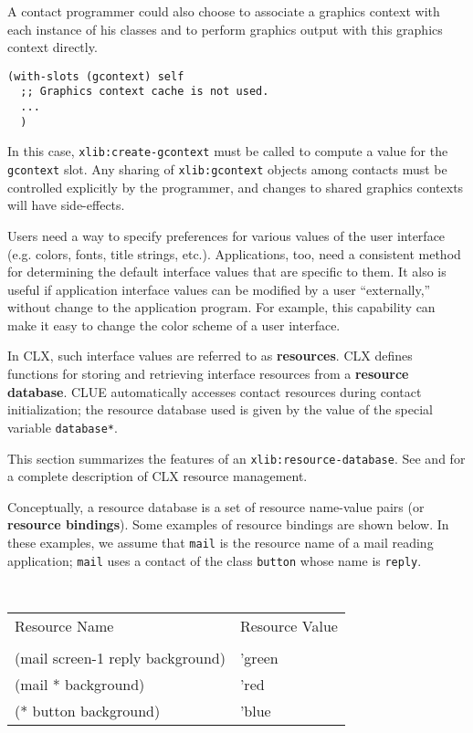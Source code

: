 \documentclass[twoside]{book}
\begin{document}
\begin{sloppy}
A contact programmer could also choose to associate a graphics context
with each instance of his classes and to perform graphics output with
this graphics context directly.

{\samepage
\begin{center}
\begin{verbatim}
(with-slots (gcontext) self
  ;; Graphics context cache is not used.
  ...
  )
\end{verbatim}

\end{center}}

In this case, {\tt xlib:create-gcontext} must be called to compute a value for the
{\tt gcontext} slot. Any sharing of {\tt xlib:gcontext} objects among
contacts must be controlled  explicitly by the programmer, and changes to shared
graphics contexts will have side-effects.


Users need a way to specify preferences for various values of the user interface
(e.g. colors, fonts, title strings, etc.). Applications, too, need a
consistent method
for determining the default interface values that are specific to them. It also
is useful if application interface values can be modified by a user
``externally,'' without change to the application program. For example, this
capability can make it easy to change the color scheme of a user
interface. 

In CLX, such interface values
are referred to as {\bf resources}. CLX defines functions for
storing and retrieving interface resources from  a {\bf resource
database}. CLUE automatically accesses contact
resources during contact initialization; the resource database used is given by
the value of the special variable {\tt *database*}.

This section summarizes the features of an {\tt xlib:resource-database}.
See \cite{xlib} and \cite{clx} for a complete description of CLX resource
management.

Conceptually, a resource database is a set of resource name-value pairs (or 
{\bf resource bindings}). Some examples of resource
bindings are shown below. In these examples, we assume that {\tt mail} is the
resource name of a mail reading application; {\tt mail} uses a contact of the
class {\tt button} whose name is {\tt reply}.

\begin{center}
\tt
\begin{tabular}{ll}
{\rm Resource Name} & {\rm Resource Value}\\
\\
(mail screen-1 reply background) & 'green\\
(mail * background)       & 'red\\
(* button background)     & 'blue
\end{tabular}
\rm
\end{center}


\end{sloppy}
\end{document}
